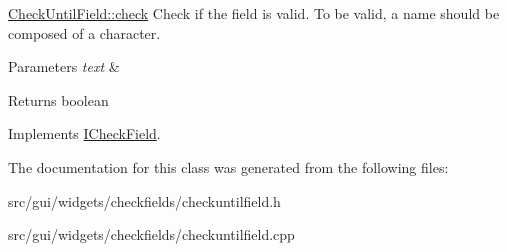 \hyperlink{classCheckUntilField_acfb9e2f95bebcb5b5d2337e3ac4f4d47}{Check\+Until\+Field\+::check} Check if the field is valid. To be valid, a name should be composed of a character. 


\begin{DoxyParams}{Parameters}
{\em text} & \\
\hline
\end{DoxyParams}
\begin{DoxyReturn}{Returns}
boolean 
\end{DoxyReturn}


Implements \hyperlink{classICheckField_a6bd42b4d49c165cdd92822135123fd4b}{I\+Check\+Field}.



The documentation for this class was generated from the following files\+:\begin{DoxyCompactItemize}
\item 
src/gui/widgets/checkfields/checkuntilfield.\+h\item 
src/gui/widgets/checkfields/checkuntilfield.\+cpp\end{DoxyCompactItemize}
